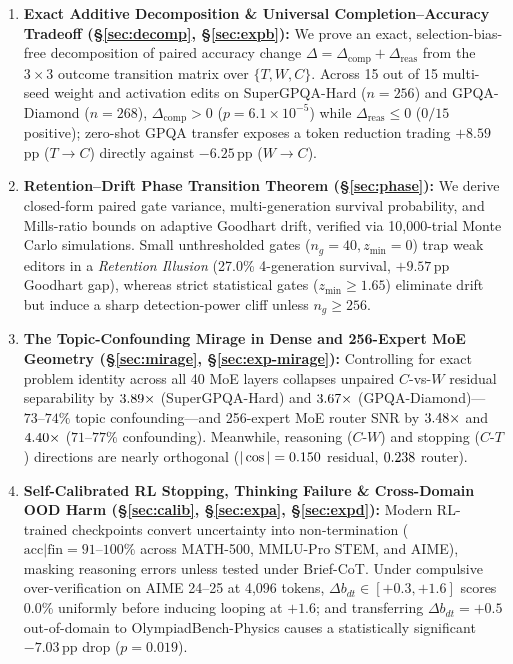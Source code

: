 \documentclass[10pt]{article}
\begin{document}
\begin{enumerate}[leftmargin=1.4em,itemsep=2pt,topsep=3pt]
    \item \textbf{Exact Additive Decomposition \& Universal Completion--Accuracy Tradeoff (\S\ref{sec:decomp}, \S\ref{sec:expb}):} We prove an exact, selection-bias-free decomposition of paired accuracy change $\Delta = \Delta_{\mathrm{comp}} + \Delta_{\mathrm{reas}}$ from the $3\times 3$ outcome transition matrix over $\{T, W, C\}$. Across 15 out of 15 multi-seed weight and activation edits on SuperGPQA-Hard ($n=256$) and GPQA-Diamond ($n=268$), $\Delta_{\mathrm{comp}}>0$ ($p=6.1\times 10^{-5}$) while $\Delta_{\mathrm{reas}}\le 0$ ($0/15$ positive); zero-shot GPQA transfer exposes a \GPQATokCut{} token reduction trading $+8.59$\,pp ($T\!\to\!C$) directly against $-6.25$\,pp ($W\!\to\!C$).
    \item \textbf{Retention--Drift Phase Transition Theorem (\S\ref{sec:phase}):} We derive closed-form paired gate variance, multi-generation survival probability, and Mills-ratio bounds on adaptive Goodhart drift, verified via 10,000-trial Monte Carlo simulations. Small unthresholded gates ($n_g=40, z_{\min}=0$) trap weak editors in a \emph{Retention Illusion} (27.0\% 4-generation survival, $+9.57$\,pp Goodhart gap), whereas strict statistical gates ($z_{\min}\ge 1.65$) eliminate drift but induce a sharp detection-power cliff unless $n_g \ge 256$.
    \item \textbf{The Topic-Confounding Mirage in Dense and 256-Expert MoE Geometry (\S\ref{sec:mirage}, \S\ref{sec:exp-mirage}):} Controlling for exact problem identity across all 40 MoE layers collapses unpaired $C$-vs-$W$ residual separability by $3.89\times$ (SuperGPQA-Hard) and $3.67\times$ (GPQA-Diamond)---$73\text{--}74\%$ topic confounding---and 256-expert MoE router SNR by $3.48\times$ and $4.40\times$ ($71\text{--}77\%$ confounding). Meanwhile, reasoning ($C\text{-}W$) and stopping ($C\text{-}T$) directions are nearly orthogonal ($|\cos|=0.150$ residual, $0.238$ router).
    \item \textbf{Self-Calibrated RL Stopping, Thinking Failure \& Cross-Domain OOD Harm (\S\ref{sec:calib}, \S\ref{sec:expa}, \S\ref{sec:expd}):} Modern RL-trained checkpoints convert uncertainty into non-termination ($\mathrm{acc}|\mathrm{fin}=91\text{--}100\%$ across MATH-500, MMLU-Pro STEM, and AIME), masking reasoning errors unless tested under Brief-CoT. Under compulsive over-verification on AIME 24--25 at 4,096 tokens, $\Delta b_{dt}\in[+0.3,+1.6]$ scores 0.0\% uniformly before inducing looping at $+1.6$; and transferring $\Delta b_{dt}=+0.5$ out-of-domain to OlympiadBench-Physics causes a statistically significant $-7.03$\,pp drop ($p=0.019$).

\end{enumerate}
\end{document}
